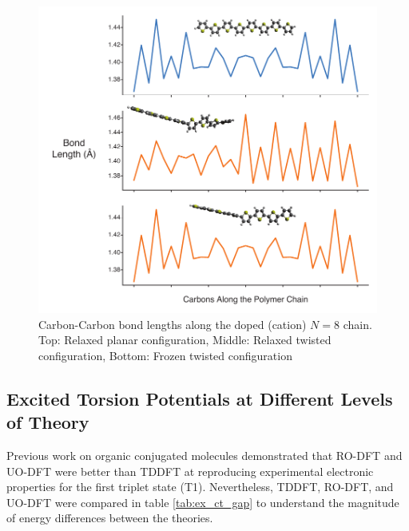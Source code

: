 \begin{figure}[hbt!]
    \centering
    \includegraphics{figures/append_tor_model/n8_fig_w.pdf}
    \caption{Carbon-Carbon bond lengths along the doped (cation) $N = 8$ chain. Top: Relaxed planar configuration, Middle: Relaxed twisted configuration, Bottom: Frozen twisted configuration}
    \label{fig:n8_bl}
\end{figure}

\clearpage

\subsection{Excited Torsion Potentials at Different Levels of Theory}

Previous work on organic conjugated molecules demonstrated that RO-DFT and UO-DFT were better than TDDFT at reproducing experimental electronic properties for the first triplet state (T1).\cite{Hait2016} Nevertheless, TDDFT, RO-DFT, and UO-DFT were compared in table \ref{tab:ex_ct_gap} to understand the magnitude of energy differences between the theories.

